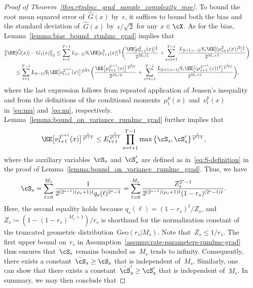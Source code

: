 \documentclass[11pt]{article}
\let\hat\widehat
\begin{document}
\begin{proof}[Proof of Theorem~\ref{thm:rtmlmc_grad_sample_complexity_mse}]
    To bound the root mean squared error of~$\hat{G}(x)$ by~$\epsilon$, it suffices to bound both the bias and the standard deviation of~$\hat{G}(x)$ by~$\epsilon/\sqrt{2}$ for any $x\in\cX$. As for the bias,  Lemma~\ref{lemma:bias_bound_rtmlmc_grad} implies that
    \begin{align*}
      & \big\| \EE[\hat{G}(x)]-G_1(x) \big\|_2 \leq \sum_{t=1}^{T-1} L_{[t-1]}S_t \EE[\nu_{t+1}^{2}(x)]^\frac{1}{2}\bigg( \frac{ \EE[\mu_{t+1}^{2}(x)]^\frac{1}{2}}{2^{M_t/2}} + \sum_{s=t+1}^{T-1} \frac{L_{[t+1:s-1]}S_s\EE[(\mu_{s+1}^{2}(x))^2]^\frac{1}{2}}{2^{M_s+1}} \bigg) \\
      & \qquad \leq \sum_{t=1}^{T-1} L_{[t-1]}S_t \EE \big[\nu_{t+1}^{2^{t+1}}(x) \big]^\frac{1}{2^{t+1}}  \bigg(\frac{\EE \big[\mu_{t+1}^{2^{t+1}}(x) \big]^\frac{1}{2^{t+1}}}{2^{M_t/2}} + \sum_{s=t+1}^{T-1} \frac{L_{[t+1:s-1]}S_s\EE \big[(\mu_{s+1}^{2^{s+1}}(x))^2 \big]^\frac{1}{2^{s+1}}}{2^{M_s+1}} \bigg),
    \end{align*}
    where the last expression follows from repeated application of Jensen's inequality and from the definitions of the conditional moments~$\mu_t^p(x)$ and~$\nu_t^p(x)$ in~\eqref{eq:mu} and~\eqref{eq:nu}, respectively. Lemma~\ref{lemma:bound_on_variance_rumlmc_grad} further implies that
    \begin{align*}
       \EE \big[\nu_{t+1}^{2^{t+1}}(x) \big]^\frac{1}{2^{t+1}} & \leq E_{t+1}^\frac{1}{2^{t+1}} \prod_{s=t+1}^{T-1} \max\big\{\cS_s, \cS_s^\prime \big\}^\frac{1}{2^{t+1}},
    \end{align*}
    where the auxiliary variables~$\cS_s$ and~$\cS_s^\prime$ are defined as in~\eqref{eq:S-definition} in the proof of Lemma~\ref{lemma:bound_on_variance_rumlmc_grad}. Thus, we have
    \begin{align*}
        \cS_s & = \sum_{\ell=0}^{M_s}\frac{1}{2^{(2^{s-1})(\rho_s+1)\ell} q_s(\ell)^{2^{s}-1}} = \sum_{\ell=0}^{M_s}\frac{Z_s^{2^s - 1} }{ 2^{(2^{s-1})(\rho_s+1)\ell} (1-r_s)^{(2^s-1)\ell} }.
    \end{align*}
    Here, the second equality holds because $q_s(\ell) = (1-r_s)^\ell/Z_s$, and~$Z_s \coloneqq  (1-(1-r_s)^{M_s+1})/r_s$ is shorthand for the normalization constant of the truncated geometric distribution~$\mathrm{Geo}(r_s | M_s)$. Note that~$Z_s\leq 1/r_s$. The first upper bound on~$r_s$ in Assumption~\ref{assump:rate-parameters-rumlmc-grad} thus ensures that~$\cS_s$ remains bounded as~$M_s$ tends to infinity. Consequently, there exists a constant~$\bar\cS_s\geq \cS_s$ that is independent of~$M_s$. Similarly, one can show that there exists a constant~$\bar{\cS}_s^\prime\geq \cS_s^\prime$ that is independent of~$M_s$. In summary, we may then conclude that

\end{proof}
\end{document}
